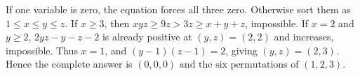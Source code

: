If one variable is zero, the equation forces all three zero. Otherwise sort them as $1\le x\le y\le z$. If $x\ge3$, then $xyz\ge9z>3z\ge x+y+z$, impossible. If $x=2$ and $y\ge2$, $2yz-y-z-2$ is already positive at $(y,z)=(2,2)$ and increases, impossible. Thus $x=1$, and $(y-1)(z-1)=2$, giving $(y,z)=(2,3)$. Hence the complete answer is $\boxed{(0,0,0)\text{ and the six permutations of }(1,2,3)}$.
